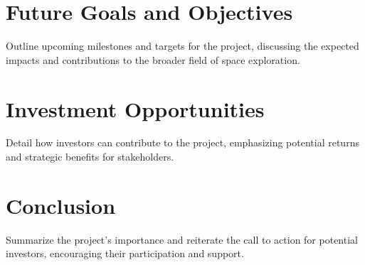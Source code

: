 \documentclass{article}
\begin{document}
\section{Future Goals and Objectives}
Outline upcoming milestones and targets for the project, discussing the expected impacts and contributions to the broader field of space exploration.

\section{Investment Opportunities}
Detail how investors can contribute to the project, emphasizing potential returns and strategic benefits for stakeholders.

\section*{Conclusion}
Summarize the project's importance and reiterate the call to action for potential investors, encouraging their participation and support.
\end{document}
